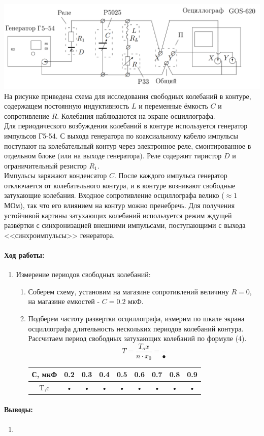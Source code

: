\documentclass[a4paper,12pt]{article}
\begin{document}
\paragraph{}
\includegraphics[scale=0.4]{setup.png} 
На рисунке приведена схема для исследования свободных колебаний в контуре, содержащем постоянную индуктивность $L$ и переменные ёмкость $C$ и сопротивление $R$. Колебания наблюдаются на экране осциллографа.\\
Для периодического возбуждения колебаний в контуре используется генератор импульсов Г5-54. С выхода генератора по коаксиальному кабелю импульсы поступают на колебательный контур через электронное реле, смонтированное в отдельном блоке (или на выходе генератора). Реле содержит тиристор $D$ и ограничительный резистор $R_1$.\\
Импульсы заряжают конденсатор $C$. После каждого импульса генератор отключается от колебательного контура, и в контуре возникают свободные затухающие колебания. Входное сопротивление осциллографа велико ($\approx 1$ МОм), так что его влиянием на контур можно пренебречь. Для получения устойчивой картины затухающих колебаний используется режим ждущей развёртки с синхронизацией внешними импульсами, поступающими с выхода <<синхроимпульсы>> генератора.

\paragraph{Ход работы:}
\begin{enumerate}
\itemsep0em
\item Измерение периодов свободных колебаний:
\begin{enumerate}
\itemsep0em
\item Соберем схему, установим на магазине сопротивлений величину $R = 0$, на магазине емкостей - $C = 0.2$ мкФ.
\item Подберем частоту развертки осциллографа, измерим по шкале экрана осциллографа длительность нескольких периодов колебаний контура. Рассчитаем период свободных затухающих колебаний по формуле (4).
\begin{equation*}
T = \frac{T_ox}{n\cdot x_0} = \frac{}{•}
\end{equation*}
\begin{tabular}{|c|c|c|c|c|c|c|c|c|}
\hline 
С, мкФ & 0.2 & 0.3 & 0.4 & 0.5 & 0.6 & 0.7 & 0.8 & 0.9 \\ 
\hline 
T,c & • & • & • & • & • & • & • & • \\ 
\hline 
\end{tabular} 
\end{enumerate}
\end{enumerate}
\paragraph{Выводы:}
\begin{enumerate}
\item
\end{enumerate}
\end{document}
